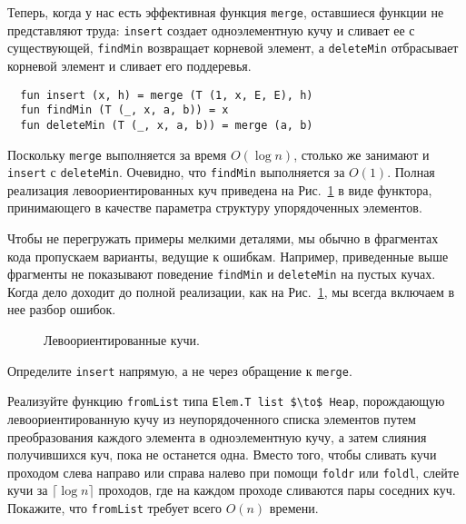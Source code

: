Теперь, когда у нас есть эффективная функция \lstinline!merge!,
оставшиеся функции не представляют труда: \lstinline!insert! создает
одноэлементную кучу и сливает ее с существующей, \lstinline!findMin!
возвращает корневой элемент, а \lstinline!deleteMin! отбрасывает
корневой элемент и сливает его поддеревья.
\begin{lstlisting}
  fun insert (x, h) = merge (T (1, x, E, E), h)
  fun findMin (T (_, x, a, b)) = x
  fun deleteMin (T (_, x, a, b)) = merge (a, b)
\end{lstlisting}
Поскольку \lstinline!merge! выполняется за время $O(\log n)$, столько
же занимают и \lstinline!insert! с \lstinline!deleteMin!. Очевидно,
что \lstinline!findMin! выполняется за $O(1)$. Полная реализация
левоориентированных куч приведена на Рис.~\ref{fig:3.2} в виде
функтора, принимающего в качестве параметра структуру упорядоченных
элементов.

\begin{remark}
  Чтобы не перегружать примеры мелкими деталями, мы обычно в
  фрагментах кода пропускаем варианты, ведущие к ошибкам. Например,
  приведенные выше фрагменты не показывают поведение
  \lstinline!findMin! и \lstinline!deleteMin! на пустых кучах.  Когда
  дело доходит до полной реализации, как на Рис.~\ref{fig:3.2}, мы
  всегда включаем в нее разбор ошибок.
\end{remark}

\begin{figure}
  \centering
  
  \caption{Левоориентированные кучи.}
  \label{fig:3.2}
\end{figure}

\begin{exercise}\label{ex:3.2}
  Определите \lstinline!insert! напрямую, а не через обращение к \lstinline!merge!.
\end{exercise}

\begin{exercise}\label{ex:3.3}
  Реализуйте функцию \lstinline!fromList! типа \lstinline!Elem.T list $\to$ Heap!,
  порождающую левоориентированную кучу из неупорядоченного списка
  элементов путем преобразования каждого элемента в одноэлементную
  кучу, а затем слияния получившихся куч, пока не останется
  одна. Вместо того, чтобы сливать кучи проходом слева направо или
  справа налево при помощи \lstinline!foldr! или \lstinline!foldl!,
  слейте кучи за $\lceil \log n \rceil$ проходов, где на каждом
  проходе сливаются пары соседних куч. Покажите, что
  \lstinline!fromList! требует всего $O(n)$ времени.
\end{exercise}

